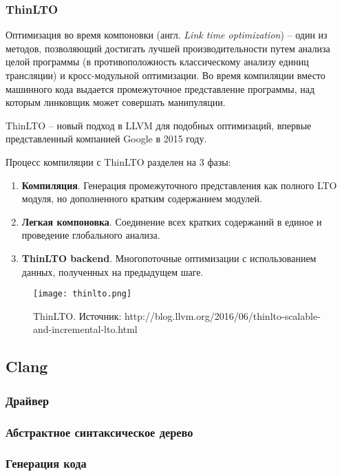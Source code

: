 \subsubsection{ThinLTO}
Оптимизация во время компоновки (англ. \textit{Link time optimization}) -- один
из методов, позволяющий достигать лучшей производительности путем анализа целой
программы (в противоположность классическому анализу единиц трансляции) и
кросс-модульной оптимизации. Во время компиляции вместо машинного кода выдается
промежуточное представление программы, над которым линковщик может совершать
манипуляции.

ThinLTO -- новый подход в LLVM для подобных оптимизаций, впервые представленный
компанией Google в 2015 году\cite{Johnson2015}.

Процесс компиляции с ThinLTO разделен на 3 фазы:
\begin{enumerate}
  \item \textbf{Компиляция}. Генерация промежуточного представления как полного
        LTO модуля, но дополненного кратким содержанием модулей.
  \item \textbf{Легкая компоновка}. Соединение всех кратких содержаний в единое
        и проведение глобального анализа.
  \item \textbf{ThinLTO backend}. Многопоточные оптимизации с использованием
        данных, полученных на предыдущем шаге.
\end{enumerate}
\begin{figure}[h]
  \centering
  \texttt{[image: thinlto.png]}
  \caption{ThinLTO. Источник: http://blog.llvm.org/2016/06/thinlto-scalable-and-incremental-lto.html}
\end{figure}

\subsection{Clang}
\subsubsection{Драйвер}
\subsubsection{Абстрактное синтаксическое дерево}
\subsubsection{Генерация кода}

